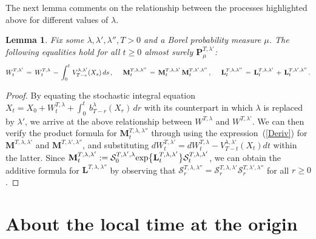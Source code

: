 \documentclass[10pt]{article}
\numberwithin{equation}{section}
\newtheorem{lemma}[theorem]{Lemma}
\theoremstyle{definition}
\begin{document}
The next lemma  comments on the relationship between the processes highlighted  above for different values of $\lambda$.
\begin{lemma}\label{LemmaRelate} Fix some $\lambda, \lambda',\lambda'',T>0$ and a Borel probability measure $\mu$.  The following equalities  hold for all $t\geq 0$  almost surely $\mathbf{P}_{\mu}^{T,\lambda'}$: 
\begin{align*}
W_{t}^{T,\lambda'}\,=\, W_{t}^{T,\lambda} \,-\,\int_0^t\, V_{T-s}^{\lambda,\lambda'}(X_s)\,ds\,, \hspace{.5cm}  \mathbf{M}^{T,\lambda,\lambda''}_{t}
\,=\, \mathbf{M}^{T,\lambda,\lambda'}_{t}\, \mathbf{M}^{T,\lambda',\lambda''}_{t}
\,, \hspace{.5cm}  \mathbf{L}^{T,\lambda,\lambda''}_{t}
\,=\, \mathbf{L}^{T,\lambda,\lambda'}_{t}\,+\, \mathbf{L}^{T,\lambda',\lambda''}_{t} \,.
\end{align*}


\end{lemma}

\begin{proof} By equating the stochastic integral equation $X_t= X_0 + W_{t}^{T,\lambda}+\int_0^t \,b^{\lambda}_{T-r}(X_r)\,dr$ with its counterpart in which $\lambda$ is replaced by $\lambda'$, we arrive at  the above relationship between $W^{T,\lambda} $ and $W^{T,\lambda'}$.  We can then verify the product formula for  $\mathbf{M}^{T,\lambda,\lambda''}_{t}$ through using the expression~(\ref{Deriv}) for  $\mathbf{M}^{T,\lambda,\lambda'}$  and $\mathbf{M}^{T,\lambda',\lambda''}$, and  substituting  $dW_{t}^{T,\lambda'}= dW_{t}^{T,\lambda} - V_{T-t}^{\lambda,\lambda'}(X_t)dt$ within the latter. Since $  \mathbf{M}^{T,\lambda,\lambda'}_{t}:=\mathcal{S}_{0}^{T,\lambda',\lambda} \textup{exp}\big\{\mathbf{L}_{t}^{T,\lambda ,\lambda'}  \big\}\mathcal{S}_{t}^{T,\lambda,\lambda'} $, we can obtain the additive formula for $\mathbf{L}^{T,\lambda,\lambda''}$ by observing that $\mathcal{S}_{r}^{T,\lambda,\lambda''}=\mathcal{S}_{r}^{T,\lambda,\lambda'}\mathcal{S}_{r}^{T,\lambda',\lambda''} $ for all $r\geq 0$. 
\end{proof}




\section{About the local time  at the origin}\label{SectionLocalTime}
\end{document}
